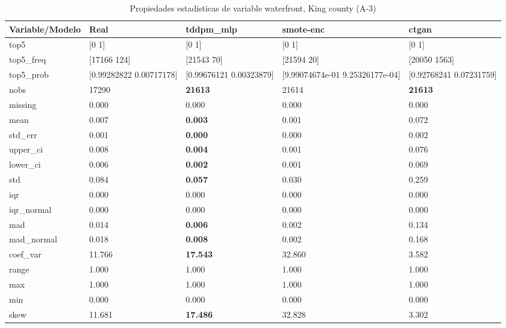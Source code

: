 \begin{table}[H]
\centering
\fontsize{8}{14}\selectfont
\caption{Propiedades  estadisticas de variable waterfront, King county (A-3)}
\label{table-stats-king county-a-3-waterfront}
\begin{tabular}{|l|m{10em}|m{10em}|m{10em}|m{10em}|}
\hline
 \rowcolor[gray]{0.8}
Variable/Modelo & Real & tddpm\_mlp & smote-enc & ctgan \\
\hline top5 & [0 1] & [0 1] & [0 1] & [0 1] \\
\hline top5\_freq & [17166   124] & [21543    70] & [21594    20] & [20050  1563] \\
\hline top5\_prob & [0.99282822 0.00717178] & [0.99676121 0.00323879] & [9.99074674e-01 9.25326177e-04] & [0.92768241 0.07231759] \\
\hline nobs & 17290 & \bfseries 21613 & \cellcolor[rgb]{0.9, 0.54, 0.52} 21614 & \bfseries 21613 \\
\hline missing & 0.000 & 0.000 & 0.000 & 0.000 \\
\hline mean & 0.007 & \bfseries 0.003 & 0.001 & \cellcolor[rgb]{0.9, 0.54, 0.52} 0.072 \\
\hline std\_err & 0.001 & \bfseries 0.000 & 0.000 & \cellcolor[rgb]{0.9, 0.54, 0.52} 0.002 \\
\hline upper\_ci & 0.008 & \bfseries 0.004 & 0.001 & \cellcolor[rgb]{0.9, 0.54, 0.52} 0.076 \\
\hline lower\_ci & 0.006 & \bfseries 0.002 & 0.001 & \cellcolor[rgb]{0.9, 0.54, 0.52} 0.069 \\
\hline std & 0.084 & \bfseries 0.057 & 0.030 & \cellcolor[rgb]{0.9, 0.54, 0.52} 0.259 \\
\hline iqr & 0.000 & 0.000 & 0.000 & 0.000 \\
\hline iqr\_normal & 0.000 & 0.000 & 0.000 & 0.000 \\
\hline mad & 0.014 & \bfseries 0.006 & 0.002 & \cellcolor[rgb]{0.9, 0.54, 0.52} 0.134 \\
\hline mad\_normal & 0.018 & \bfseries 0.008 & 0.002 & \cellcolor[rgb]{0.9, 0.54, 0.52} 0.168 \\
\hline coef\_var & 11.766 & \bfseries 17.543 & \cellcolor[rgb]{0.9, 0.54, 0.52} 32.860 & 3.582 \\
\hline range & 1.000 & 1.000 & 1.000 & 1.000 \\
\hline max & 1.000 & 1.000 & 1.000 & 1.000 \\
\hline min & 0.000 & 0.000 & 0.000 & 0.000 \\
\hline skew & 11.681 & \bfseries 17.486 & \cellcolor[rgb]{0.9, 0.54, 0.52} 32.828 & 3.302 \\

\end{tabular}
\end{table}
